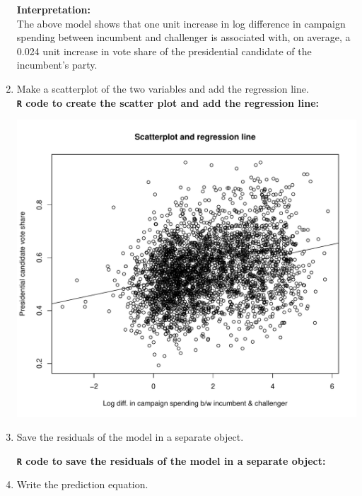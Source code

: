 \documentclass[12pt,letterpaper]{article}
\begin{document}
\begin{enumerate}
		\pagebreak
		
		\textbf{Interpretation:}\\
		The above model shows that one unit increase in log difference in campaign spending between incumbent and challenger is associated with, on average, a 0.024 unit increase in vote share of the presidential candidate of the incumbent's party.\\
		
		\item Make a scatterplot of the two variables and add the regression line.\\
		
		\textbf{\texttt{R} code to create the scatter plot and add the regression line:}
		  
		
		\begin{center}
			\includegraphics[width=14cm]{plot2.pdf}  
		\end{center}
		
		\item Save the residuals of the model in a separate object.
		
		\textbf{\texttt{R} code to save the residuals of the model in a separate object:}
		  
		
		\item Write the prediction equation.
		

\end{enumerate}
\end{document}
